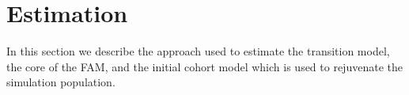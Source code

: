 \section{Estimation}
In this section we describe the approach used to estimate the transition model, the core of the FAM, and the initial cohort model which is 
used to rejuvenate the simulation population. 


%
%
